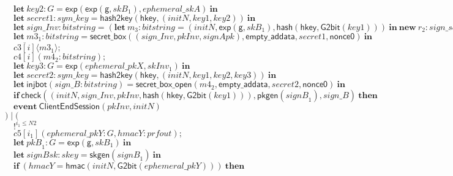 \documentclass{article}
\newcommand{\cinput}[2]{{#1}({#2})}
\newcommand{\coutput}[2]{\overline{#1}\langle{#2}\rangle}
\newcommand{\kw}[1]{\mathbf{#1}}
\newcommand{\kwf}[1]{\mathsf{#1}}
\newcommand{\var}[1]{\mathit{#1}}
\newcommand{\kwt}[1]{\mathit{#1}}
\newcommand{\kwp}[1]{\mathit{#1}}
\newcommand{\kwc}[1]{\mathit{#1}}
\begin{document}
\begin{tabbing}
\>$\quad \kw{let}\ \var{key2}: \kwt{G} = \kwf{exp}(\kwf{exp}(\kwf{g}, \var{skB}_{1}), \var{ephemeral{\_}skA})\ \kw{in}$\\
\>$\quad \kw{let}\ \var{secret1}: \kwt{sym{\_}key} = \kwf{hash2key}(\kwf{hkey}, \kwf{}(\var{initN}, \var{key1}, \var{key2}))\ \kw{in}$\\
\>$\quad \kw{let}\ \var{sign{\_}Inv}: \kwt{bitstring} = (\kw{let}\ \var{m}_{3}: \kwt{bitstring} = \kwf{}(\var{initN}, \kwf{exp}(\kwf{g}, \var{skB}_{1}), \kwf{hash}(\kwf{hkey}, \kwf{G2bit}(\var{key1})))\ \kw{in}\ \kw{new}\ \var{r}_{2}: \kwt{sign{\_}seed};\ \kwf{sign{\_}r}(\var{m}_{3}, \var{signAsk}, \var{r}_{2}))\ \kw{in}$\\
\>$\quad \kw{let}\ \var{m3}_{1}: \kwt{bitstring} = \kwf{secret{\_}box}(\kwf{}(\var{sign{\_}Inv}, \var{pkInv}, \var{signApk}), \kwf{empty{\_}addata}, \var{secret1}, \kwf{nonce0})\ \kw{in}$\\
\>$\quad \coutput{\kwc{c3}[\var{i}]}{\var{m3}_{1}};$\\
\>$\quad \cinput{\kwc{c4}[\var{i}]}{\var{m4}_{2}: \kwt{bitstring}};$\\
\>$\quad \kw{let}\ \var{key3}: \kwt{G} = \kwf{exp}(\var{ephemeral{\_}pkX}, \var{skInv}_{1})\ \kw{in}$\\
\>$\quad \kw{let}\ \var{secret2}: \kwt{sym{\_}key} = \kwf{hash2key}(\kwf{hkey}, \kwf{}(\var{initN}, \var{key1}, \var{key2}, \var{key3}))\ \kw{in}$\\
\>$\quad \kw{let}\ \kwf{injbot}(\var{sign{\_}B}: \kwt{bitstring}) = \kwf{secret{\_}box{\_}open}(\var{m4}_{2}, \kwf{empty{\_}addata}, \var{secret2}, \kwf{nonce0})\ \kw{in}$\\
\>$\quad \kw{if}\ \kwf{check}(\kwf{}(\var{initN}, \var{sign{\_}Inv}, \var{pkInv}, \kwf{hash}(\kwf{hkey}, \kwf{G2bit}(\var{key1}))), \kwf{pkgen}(\var{signB}_{1}), \var{sign{\_}B})\ \kw{then}$\\
\>$\quad \kw{event}\ \kwf{ClientEndSession}(\var{pkInv}, \var{initN})$\\
\>$) \mid ($\\
\>$\quad !^{\var{i}_{1} \leq \kwp{N2}}$\\
\>$\quad \cinput{\kwc{c5}[\var{i}_{1}]}{\var{ephemeral{\_}pkY}: \kwt{G}, \var{hmacY}: \kwt{prfout}};$\\
\>$\quad \kw{let}\ \var{pkB}_{1}: \kwt{G} = \kwf{exp}(\kwf{g}, \var{skB}_{1})\ \kw{in}$\\
\>$\quad \kw{let}\ \var{signBsk}: \kwt{skey} = \kwf{skgen}(\var{signB}_{1})\ \kw{in}$\\
\>$\quad \kw{if}\ (\var{hmacY}  =  \kwf{hmac}(\var{initN}, \kwf{G2bit}(\var{ephemeral{\_}pkY})))\ \kw{then}$\\

\end{tabbing}
\end{document}
